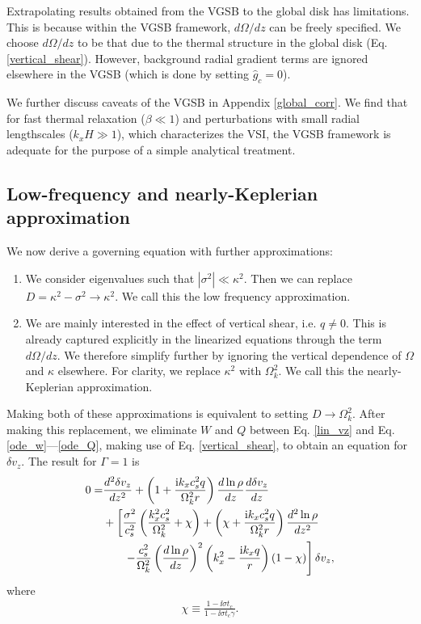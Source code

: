 Extrapolating results obtained from the VGSB to the global disk has
limitations. This is because within the VGSB framework, $d\Omega/dz$
can be freely specified. 
We choose $d\Omega/dz$ to be that due to the thermal structure in 
the global disk (Eq. \ref{vertical_shear}). However, background radial
gradient terms are ignored elsewhere in the VGSB (which is done by
setting $\hat{g}_c=0$).       


We further discuss caveats of the VGSB in Appendix
\ref{global_corr}. We find that for fast thermal relaxation
($\beta\ll1$) and perturbations with small radial
lengthscales ($k_xH\gg 1$), which characterizes the VSI, the VGSB
framework is adequate for the purpose of a simple analytical
treatment.  

\subsection{Low-frequency and nearly-Keplerian
  approximation}\label{approx_gov} 
We now derive a governing equation with further approximations:
\begin{enumerate}
\item We consider eigenvalues such that
  $|\sigma^2|\ll \kappa^2$. Then we can replace $D=\kappa^2 -\sigma^2\to
  \kappa^2$. %
  We call this the low frequency approximation. %
\item We are mainly interested in the effect of vertical shear, i.e. $q\neq
  0$. This is already captured explicitly in the linearized equations through
  the term $d\Omega/dz$. We therefore simplify 
  further by ignoring the vertical dependence of $\Omega$ and $\kappa$
  elsewhere. For clarity, we replace $\kappa^2$ with
  $\Omega_k^2$. We call this the nearly-Keplerian approximation. 
  
\end{enumerate}
Making both of these approximations is equivalent to setting 
$D\to\Omega_k^2$.  After making this replacement, we eliminate $W$ and
$Q$ between  Eq. \ref{lin_vz} and Eq. \ref{ode_w}---\ref{ode_Q},
making use of Eq. \ref{vertical_shear}, to
obtain an equation for $\delta v_z$. The result for $\Gamma=1$ is
\begin{align}
  0 =& \frac{d^2\delta v_z}{dz^2} + \left(1 + \frac{\mathrm{i} k_x c_s^2
      q}{\Omega_k^2r}\right)\frac{d\ln\rho}{dz}\frac{d\delta
    v_z}{dz} \notag\\
  &+ \left[\frac{\sigma^2}{c_s^2}\left(\frac{k_x^2c_s^2}{\Omega_k^2} +
      \chi\right) + \left(\chi + \frac{\mathrm{i} k_x c_s^2
        q}{\Omega_k^2r}\right)\frac{d^2\ln\rho}{dz^2}\right. \notag\\
  &\phantom{+=}\left.-
    \frac{c_s^2}{\Omega_k^2}\left(\frac{d\ln\rho}{dz}\right)^2\left(k_x^2 -
      \frac{\mathrm{i} k_x q}{r}\right)
    \left(1-\chi\right) 
  \right]\delta v_z,\label{vertiso_gov}
\end{align}
where
\begin{align}
  \chi \equiv \frac{1-\ii\sigma t_c}{1-\ii\sigma t_c\gamma}.
\end{align}


